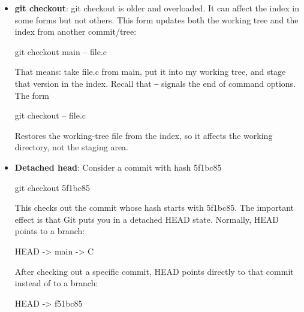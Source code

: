 \documentclass{report}
\begin{document}
\begin{itemize}
\begin{itemize}
                \item \textbf{git checkout}: git checkout is older and overloaded. It can affect the index in some forms but not others.
                    \bigbreak \noindent 
                    This form updates both the working tree and the index from another commit/tree:
                    \bigbreak \noindent 
                    \begin{bashcode}
                        git checkout main -- file.c
                    \end{bashcode}
                    \bigbreak \noindent 
                    That means: take file.c from main, put it into my working tree, and stage that version in the index.
                    \bigbreak \noindent 
                    Recall that \texttt{--} signals the end of command options. 
                    \bigbreak \noindent 
                    The form
                    \bigbreak \noindent 
                    \begin{bashcode}
                        git checkout -- file.c
                    \end{bashcode}
                    \bigbreak \noindent 
                    Restores the working-tree file from the index, so it affects the working directory, not the staging area.
                \item \textbf{Detached head}: Consider a commit with hash 5f1bc85
                    \bigbreak \noindent 
                    \begin{bashcode}
                        git checkout 5f1bc85
                    \end{bashcode}
                    \bigbreak \noindent 
                    This checks out the commit whose hash starts with 5f1bc85.
                    \bigbreak \noindent 
                    The important effect is that Git puts you in a detached HEAD state.
                    \bigbreak \noindent 
                    Normally, HEAD points to a branch:
                    \bigbreak \noindent 
                    \begin{bashcode}
                        HEAD -> main -> C
                    \end{bashcode}
                    \bigbreak \noindent 
                    After checking out a specific commit, HEAD points directly to that commit instead of to a branch:
                    \bigbreak \noindent 
                    \begin{bashcode}
                        HEAD -> f51bc85
                    \end{bashcode}

\end{itemize}
\end{itemize}
\end{document}
